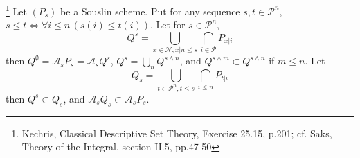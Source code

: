 \begin{lemma} \label{L:sous_op}
  \footnote{
    Kechris, Classical Descriptive Set Theory, Exercise 25.15, p.201;
    cf. Saks, Theory of the Integral, section II.5, pp.47-50
  }
  Let $(P_s)$ be a Souslin scheme. Put for any sequence $s,t\in\mathcal{P}^n$,
  $s\le t \iff \forall i\le n\, (s(i)\le t(i))$. Let for $s\in\mathcal{P}^n$,
  \[
    Q^s = \bigcup_{x\in\mathcal{N}, x|n\le s} \bigcap_{i\in\mathcal{P}} P_{x|i}
  \]
  then $Q^{\emptyset}=\mathcal{A}_s P_s = \mathcal{A}_s Q^s$,
  $Q^s=\bigcup_n Q^{s\wedge n}$, and $Q^{s\wedge m}\subset Q^{s\wedge n}$
  if $m\le n$. Let
  \[
    Q_s = \bigcup_{t\in\mathcal{P}^n, t\le s} \bigcap_{i\le n} P_{t|i}
  \]
then $Q^s\subset Q_s$, and $\mathcal{A}_s Q_s\subset \mathcal{A}_s P_s$.
\end{lemma}
